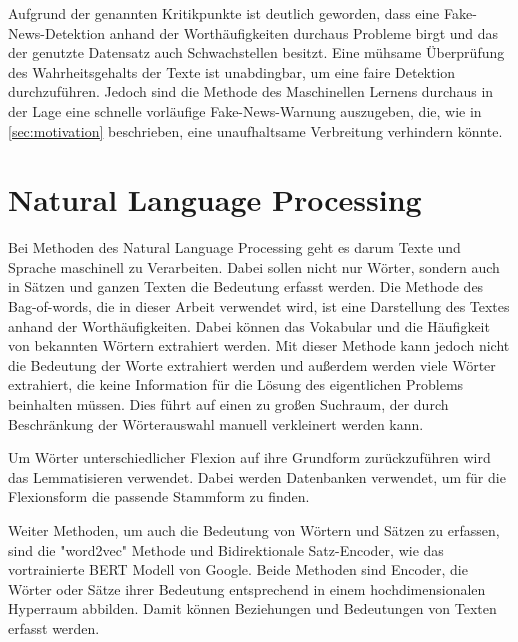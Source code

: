 Aufgrund der genannten Kritikpunkte ist deutlich geworden, dass eine Fake-News-Detektion anhand der Worthäufigkeiten 
durchaus Probleme birgt und das der genutzte Datensatz auch Schwachstellen besitzt.
Eine mühsame Überprüfung des Wahrheitsgehalts der Texte ist unabdingbar, um eine faire Detektion durchzuführen.
Jedoch sind die Methode des Maschinellen Lernens durchaus in der Lage eine schnelle 
vorläufige Fake-News-Warnung auszugeben, die, wie in \autoref{sec:motivation} beschrieben, eine unaufhaltsame 
Verbreitung verhindern könnte.


\appendix
\chapter{Natural Language Processing}
\label{sec:NLP}
Bei Methoden des Natural Language Processing geht es darum Texte und Sprache maschinell zu Verarbeiten. Dabei 
sollen nicht nur Wörter, sondern auch in Sätzen und ganzen Texten die Bedeutung erfasst werden. 
Die Methode des Bag-of-words, die in dieser Arbeit verwendet wird, ist eine Darstellung des Textes anhand der 
Worthäufigkeiten. 
Dabei können das Vokabular und die Häufigkeit von bekannten Wörtern extrahiert werden. 
Mit dieser Methode kann jedoch nicht die Bedeutung der Worte extrahiert werden und außerdem werden viele Wörter 
extrahiert, die keine Information für die Lösung des eigentlichen Problems beinhalten müssen. 
Dies führt auf einen zu großen Suchraum, der durch Beschränkung der Wörterauswahl manuell verkleinert werden kann.

Um Wörter unterschiedlicher Flexion auf ihre Grundform zurückzuführen wird das Lemmatisieren verwendet. 
Dabei werden Datenbanken verwendet, um für die Flexionsform die passende Stammform zu finden.

Weiter Methoden, um auch die Bedeutung von Wörtern und Sätzen zu erfassen, sind die "word2vec" Methode und Bidirektionale Satz-Encoder, 
wie das vortrainierte BERT Modell von Google\cite{bert}. Beide Methoden sind Encoder, die Wörter oder Sätze ihrer 
Bedeutung entsprechend in einem hochdimensionalen Hyperraum abbilden. Damit können Beziehungen und Bedeutungen 
von Texten erfasst werden.


